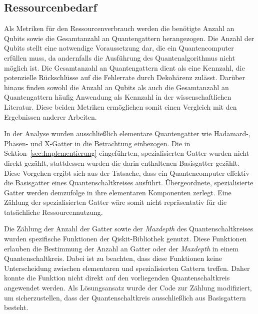\subsection*{Ressourcenbedarf}
Als Metriken für den Ressourcenverbrauch werden die benötigte Anzahl an Qubits sowie die Gesamtanzahl an Quantengattern herangezogen. 
Die Anzahl der Qubits stellt eine notwendige Voraussetzung dar, 
die ein Quantencomputer erfüllen muss, da andernfalls die Ausführung des Quantenalgorithmus nicht möglich ist. 
Die Gesamtanzahl an Quantengattern dient als eine Kennzahl, 
die potenzielle Rückschlüsse auf die Fehlerrate durch Dekohärenz zulässt. 
Darüber hinaus finden sowohl die Anzahl an Qubits als auch die Gesamtanzahl an Quantengattern häufig Anwendung als Kennzahl in der wissenschaftlichen Literatur. 
Diese beiden Metriken ermöglichen somit einen Vergleich mit den Ergebnissen anderer Arbeiten.

In der Analyse wurden ausschließlich elementare Quantengatter wie Hadamard-, Phasen- und X-Gatter in die Betrachtung einbezogen. 
Die in Sektion~\ref{sec:Implementierung} eingeführten, spezialisierten Gatter wurden nicht direkt gezählt, 
stattdessen wurden die darin enthaltenen Basisgatter gezählt. 
Diese Vorgehen ergibt sich aus der Tatsache, dass ein Quantencomputer effektiv die Basisgatter eines Quantenschaltkreises ausführt. 
Übergeordnete, spezialisierte Gatter werden demzufolge in ihre elementaren Komponenten zerlegt. 
Eine Zählung der spezialisierten Gatter wäre somit nicht repräsentativ für die tatsächliche Ressourcennutzung.

Die Zählung der Anzahl der Gatter sowie der \textit{Maxdepth} des Quantenschaltkreises wurden spezifische Funktionen der Qiskit-Bibliothek genutzt. 
Diese Funktionen erlauben die Bestimmung der Anzahl an Gatter oder der \textit{Maxdepth} in einem Quantenschaltkreis.
Dabei ist zu beachten, dass diese Funktionen keine Unterscheidung zwischen elementaren und spezialisierten Gattern treffen.
Daher konnte die Funktion nicht direkt auf den vorliegenden Quantenschaltkreis angewendet werden. 
Als Lösungsansatz wurde der Code zur Zählung modifiziert, um sicherzustellen, dass der Quantenschaltkreis ausschließlich aus Basisgattern besteht.

